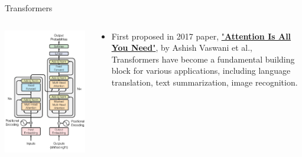 \documentclass{beamer}
\begin{document}
\begin{frame}[fragile]{Transformers}
    \begin{columns}[T]
        \begin{column}{.48\textwidth}
            \begin{center}
                \includegraphics[width=\textwidth,height=0.8\textheight,keepaspectratio]{figures/Transformer-Model.png}
            \end{center}
        \end{column}%
        \hfill%
        \begin{column}{.48\textwidth}
            \begin{itemize}
                \item First proposed in 2017 paper, \href{https://arxiv.org/abs/1706.03762}{"\textbf{Attention Is All You Need}"}, by Ashish Vaswani et al., Transformers have become a fundamental building block for various applications, including language translation, text summarization, image recognition.
            \end{itemize}
        \end{column}%
    \end{columns}
\end{frame}
\end{document}
